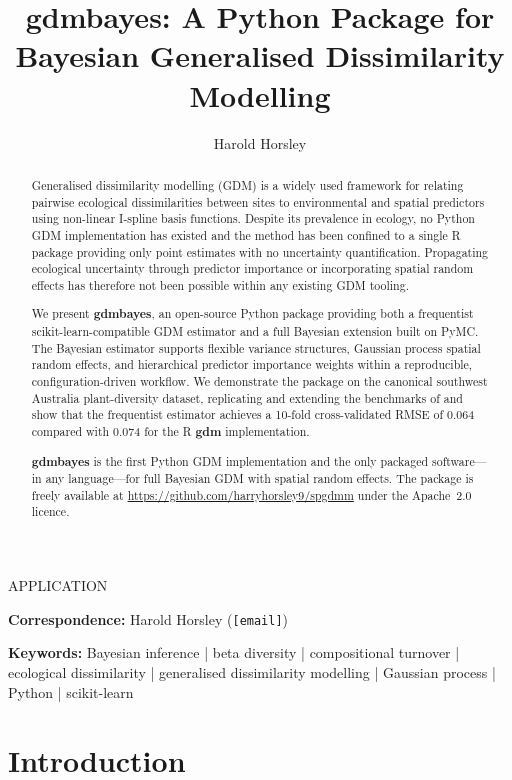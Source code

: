 \documentclass[12pt,a4paper]{article}
\title{\textbf{gdmbayes}: A Python Package for Bayesian Generalised
       Dissimilarity Modelling}
\author[1]{Harold Horsley}
\affil[1]{[Department], [Institution], [City], [Country]}
\date{}
\newcommand{\articletype}[1]{%
  \begin{center}\small\textsc{#1}\end{center}\vspace{-0.5em}}
\newcommand{\corres}[1]{%
  \par\noindent\footnotesize\textbf{Correspondence:} #1\par}
\begin{document}
\maketitle
\articletype{APPLICATION}
\corres{Harold Horsley (\texttt{[email]})}

\doublespacing

\begin{abstract}
\noindent
Generalised dissimilarity modelling (GDM) is a widely used framework for
relating pairwise ecological dissimilarities between sites to environmental
and spatial predictors using non-linear I-spline basis functions. Despite its
prevalence in ecology, no Python GDM implementation has existed and the method
has been confined to a single R package providing only point estimates with no
uncertainty quantification. Propagating ecological uncertainty through predictor
importance or incorporating spatial random effects has therefore not been
possible within any existing GDM tooling.

We present \textbf{gdmbayes}, an open-source Python package providing both a
frequentist scikit-learn-compatible GDM estimator and a full Bayesian extension
built on PyMC. The Bayesian estimator supports flexible variance structures,
Gaussian process spatial random effects, and hierarchical predictor importance
weights within a reproducible, configuration-driven workflow. We demonstrate
the package on the canonical southwest Australia plant-diversity dataset,
replicating and extending the benchmarks of \citet{white2024} and show that
the frequentist estimator achieves a 10-fold cross-validated RMSE of 0.064
compared with 0.074 for the R \textbf{gdm} implementation.

\textbf{gdmbayes} is the first Python GDM implementation and the only
packaged software---in any language---for full Bayesian GDM with spatial
random effects. The package is freely available at
\url{https://github.com/harryhorsley9/spgdmm} under the Apache~2.0 licence.
\end{abstract}

\noindent\textbf{Keywords:} Bayesian inference | beta diversity |
compositional turnover | ecological dissimilarity |
generalised dissimilarity modelling | Gaussian process |
Python | scikit-learn

\clearpage

\section{Introduction}\label{sec:intro}
\end{document}

